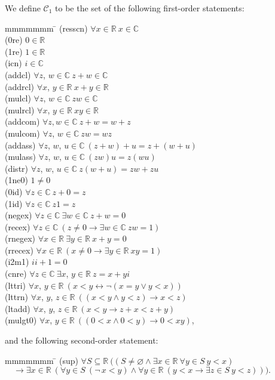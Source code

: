 \documentclass{article}
\newcommand\bC{\mathbb{C}}
\newcommand\bR{\mathbb{R}}
\newcommand\cC{\mathcal{C}}
\begin{document}
We define $\cC_1$ to be the set of the following first-order statements:
\begin{tabbing}
mmmmmmm \=\kill
(resscn)  \> $\forall x \in \bR\ x \in \bC$ \\
(0re)     \> $0 \in \bR$ \\
(1re)     \> $1 \in \bR$ \\
(icn)     \> $i \in \bC$ \\
(addcl)   \> $\forall z$, $w \in \bC\ z+w\in\bC$ \\
(addrcl)  \> $\forall x$, $y \in \bR\ x+y\in\bR$ \\
(mulcl)   \> $\forall z$, $w \in \bC\ zw\in\bC$ \\
(mulrcl)  \> $\forall x$, $y \in \bR\ xy\in\bR$ \\
(addcom)  \> $\forall z,w \in \bC\ z+w=w+z$ \\
(mulcom)  \> $\forall z$, $w \in \bC\ zw=wz$ \\
(addass)  \> $\forall z$, $w$, $u \in \bC\ (z+w)+u=z+(w+u)$ \\
(mulass)  \> $\forall z$, $w$, $u \in \bC\ (zw)u=z(wu)$ \\
(distr)   \> $\forall z$, $w$, $u \in \bC\ z(w+u) = zw + zu$ \\
(1ne0)    \> $1 \ne 0$ \\
(0id)     \> $\forall z \in \bC\ z+0=z$ \\
(1id)     \> $\forall z \in \bC\ z1=z$ \\
(negex)   \> $\forall z \in \bC\ \exists w \in \bC\ z + w = 0$ \\
(recex)   \> $\forall z \in \bC\ (z \ne 0 \rightarrow \exists w \in \bC\ zw = 1)$ \\
(rnegex)  \> $\forall x \in \bR\ \exists y \in \bR\ x + y = 0$ \\
(rrecex)  \> $\forall x \in \bR\ (x \ne 0 \rightarrow \exists y \in \bR\ xy = 1)$ \\
(i2m1)    \> $ii + 1 = 0$ \\
(cnre)    \> $\forall z \in \bC\ \exists x$, $y \in \bR\ z = x + yi$ \\
(lttri)   \> $\forall x$, $y \in \bR\ (x < y \leftrightarrow \lnot (x=y \vee y < x))$ \\
(lttrn)   \> $\forall x$, $y$, $z \in \bR\ ((x < y \wedge y < z) \rightarrow x < z)$ \\
(ltadd)   \> $\forall x$, $y$, $z \in \bR\ (x < y \rightarrow z + x < z + y)$ \\
(mulgt0)  \> $\forall x$, $y \in \bR\ ((0 < x \wedge 0 < y) \rightarrow 0 < xy)$,
\end{tabbing}
and the following second-order statement:
\begin{tabbing}
mmmmmmm \=\kill
(sup)     \> $\forall S \subseteq \bR\ ((S \ne \varnothing \wedge \exists x \in \bR 
             \ \forall y \in S\ y < x)$ \\
          \> $\quad\rightarrow \exists x \in \bR\ (\forall y \in S\ (\lnot\,x < y) \wedge
              \forall y \in \bR\ (y < x \rightarrow \exists z \in S\ y < z))).$
\end{tabbing}
\end{document}
